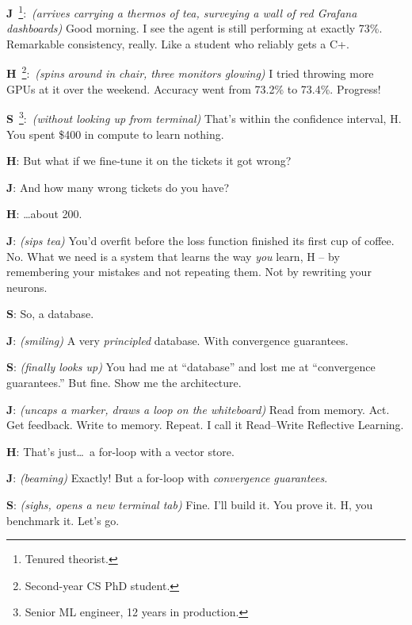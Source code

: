 \documentclass[11pt,a4paper]{article}
\newcommand{\J}[0]{{\sffamily\bfseries\color{marginJ}J}}
\newcommand{\Hstudent}[0]{{\sffamily\bfseries\color{marginH}H}}
\newcommand{\Senior}[0]{{\sffamily\bfseries\color{marginS}S}}
\newcommand{\stage}[1]{{\small\itshape\color{black!50}(#1)}}
\begin{document}
\begin{dialogue}

\J~\footnote{Tenured theorist.}:~\stage{arrives carrying a thermos of tea, surveying a wall of red Grafana dashboards} Good morning. I see the agent is still performing at exactly 73\%. Remarkable consistency, really. Like a student who reliably gets a C+.

\vspace{4pt}
\Hstudent~\footnote{Second-year CS PhD student.}:~\stage{spins around in chair, three monitors glowing} I tried throwing more GPUs at it over the weekend. Accuracy went from 73.2\% to 73.4\%. Progress!

\vspace{4pt}
\Senior~\footnote{Senior ML engineer, 12 years in production.}:~\stage{without looking up from terminal} That's within the confidence interval, H. You spent \$400 in compute to learn nothing.

\vspace{4pt}
\Hstudent: But what if we fine-tune it on the tickets it got wrong?

\vspace{4pt}
\J: And how many wrong tickets do you have?

\vspace{4pt}
\Hstudent: \ldots about 200.

\vspace{4pt}
\J: \stage{sips tea} You'd overfit before the loss function finished its first cup of coffee. No. What we need is a system that learns the way \textit{you} learn, H -- by remembering your mistakes and not repeating them. Not by rewriting your neurons.

\vspace{4pt}
\Senior: So, a database.

\vspace{4pt}
\J: \stage{smiling} A very \textit{principled} database. With convergence guarantees.

\vspace{4pt}
\Senior: \stage{finally looks up} You had me at ``database'' and lost me at ``convergence guarantees.'' But fine. Show me the architecture.

\vspace{4pt}
\J: \stage{uncaps a marker, draws a loop on the whiteboard} Read from memory. Act. Get feedback. Write to memory. Repeat. I call it Read--Write Reflective Learning.

\vspace{4pt}
\Hstudent: That's just\ldots\ a for-loop with a vector store.

\vspace{4pt}
\J: \stage{beaming} Exactly! But a for-loop with \textit{convergence guarantees}.

\vspace{4pt}
\Senior: \stage{sighs, opens a new terminal tab} Fine. I'll build it. You prove it. H, you benchmark it. Let's go.

\end{dialogue}
\end{document}
